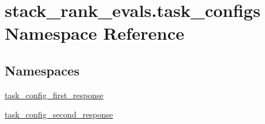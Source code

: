 \hypertarget{namespacestack__rank__evals_1_1task__configs}{}\section{stack\+\_\+rank\+\_\+evals.\+task\+\_\+configs Namespace Reference}
\label{namespacestack__rank__evals_1_1task__configs}
\subsection*{Namespaces}
\begin{DoxyCompactItemize}
\item 
 \hyperlink{namespacestack__rank__evals_1_1task__configs_1_1task__config__first__response}{task\+\_\+config\+\_\+first\+\_\+response}
\item 
 \hyperlink{namespacestack__rank__evals_1_1task__configs_1_1task__config__second__response}{task\+\_\+config\+\_\+second\+\_\+response}
\end{DoxyCompactItemize}
